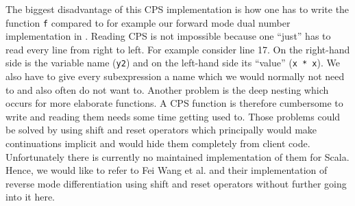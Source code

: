 The biggest disadvantage of this CPS implementation is how one has to write the function \lstinline{f} compared to for example our forward mode dual number implementation in . Reading CPS is not impossible because one ``just'' has to read every line from right to left. For example consider line 17. On the right-hand side is the variable name (\lstinline{y2}) and on the left-hand side its ``value'' (\lstinline{x * x}). We also have to give every subexpression a name which we would normally not need to and also often do not want to. Another problem is the deep nesting which occurs for more elaborate functions. A CPS function is therefore cumbersome to write and reading them needs some time getting used to. Those problems could be solved by using shift and reset operators which principally would make continuations implicit and would hide them completely from client code. Unfortunately there is currently no maintained implementation of them for Scala. Hence, we would like to refer to Fei Wang et al. \cite{lantern} and their implementation of reverse mode differentiation using shift and reset operators without further going into it here.
